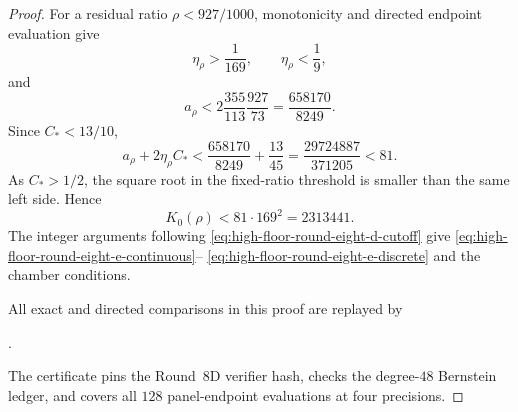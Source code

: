\documentclass[11pt]{article}
\theoremstyle{remark}
\begin{document}
\begin{proof}
For a residual ratio $\rho<927/1000$, monotonicity and directed
endpoint evaluation give
\[
 \eta_\rho>\frac1{169},\qquad \eta_\rho<\frac19,
\]
and
\[
 a_\rho<
 2\frac{355}{113}\frac{927}{73}
 =\frac{658170}{8249}.
\]
Since $C_*<13/10$,
\[
 a_\rho+2\eta_\rho C_*
 <\frac{658170}{8249}+\frac{13}{45}
 =\frac{29724887}{371205}<81.
\]
As $C_*>1/2$, the square root in the fixed-ratio threshold is
smaller than the same left side.  Hence
\begin{equation}
 \boxed{K_0(\rho)<81\mathbin{\cdot}169^2=2313441.}
 \label{eq:high-floor-round-eight-e-cutoff}
\end{equation}
The integer arguments following
\eqref{eq:high-floor-round-eight-d-cutoff} give
\eqref{eq:high-floor-round-eight-e-continuous}--%
\eqref{eq:high-floor-round-eight-e-discrete} and the chamber conditions.

All exact and directed comparisons in this proof are replayed by
\begin{center}
 \small{}.
\end{center}
The certificate pins the Round~8D verifier hash, checks the
degree-$48$ Bernstein ledger, and covers all $128$ panel-endpoint
evaluations at four precisions.
\end{proof}
\end{document}
